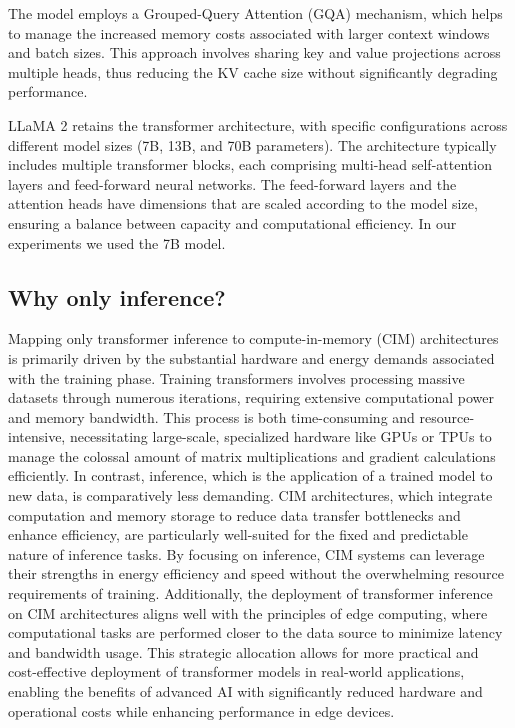 \documentclass[conference]{IEEEtran}
\begin{document}
\begin{itemize}
The model employs a Grouped-Query Attention (GQA) mechanism, which helps to manage the increased memory costs associated with larger context windows and batch sizes. This approach involves sharing key and value projections across multiple heads, thus reducing the KV cache size without significantly degrading performance.

LLaMA 2 retains the transformer architecture, with specific configurations across different model sizes (7B, 13B, and 70B parameters). The architecture typically includes multiple transformer blocks, each comprising multi-head self-attention layers and feed-forward neural networks. The feed-forward layers and the attention heads have dimensions that are scaled according to the model size, ensuring a balance between capacity and computational efficiency. In our experiments we used the 7B model. 
\end{itemize}

\subsection{Why only inference?}
Mapping only transformer inference to compute-in-memory (CIM) architectures is primarily driven by the substantial hardware and energy demands associated with the training phase. Training transformers involves processing massive datasets through numerous iterations, requiring extensive computational power and memory bandwidth. This process is both time-consuming and resource-intensive, necessitating large-scale, specialized hardware like GPUs or TPUs to manage the colossal amount of matrix multiplications and gradient calculations efficiently. In contrast, inference, which is the application of a trained model to new data, is comparatively less demanding. CIM architectures, which integrate computation and memory storage to reduce data transfer bottlenecks and enhance efficiency, are particularly well-suited for the fixed and predictable nature of inference tasks. By focusing on inference, CIM systems can leverage their strengths in energy efficiency and speed without the overwhelming resource requirements of training. Additionally, the deployment of transformer inference on CIM architectures aligns well with the principles of edge computing, where computational tasks are performed closer to the data source to minimize latency and bandwidth usage. This strategic allocation allows for more practical and cost-effective deployment of transformer models in real-world applications, enabling the benefits of advanced AI with significantly reduced hardware and operational costs while enhancing performance in edge devices.
\end{document}
